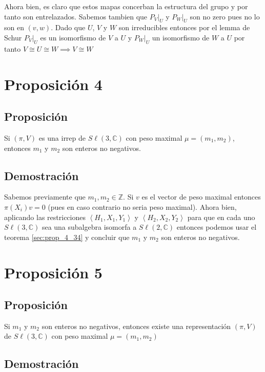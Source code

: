 \documentclass[12pt]{exam}
\begin{document}
Ahora bien, es claro que estos mapas concerban la estructura del grupo y por tanto son entrelazados. Sabemos tambien que $\left.P_V\right|_{U}$ y $\left.P_W\right|_{U}$ son no zero pues no lo son en $(v, w)$. Dado que $U$, $V$ y $W$ son irreducibles entonces por el lemma de Schur $\left.P_V\right|_{U}$ es un isomorfismo de $V$ a $U$ y $\left.P_W\right|_{U}$ un isomorfismo de $W$ a $U$ por tanto $V \cong U \cong W \implies V \cong W$


\section{Proposición 4}

\subsection{Proposición}

Si $(\pi, V)$ es una irrep de $S\ell(3, \mathbb{C})$ con peso maximal $\mu = (m_1, m_2)$, entonces $m_1$ y $m_2$ son enteros no negativos.


\subsection{Demostración}

Sabemos previamente que $m_1, m_2 \in \mathbb{Z}$. Si $v$ es el vector de peso maximal entonces $\pi(X_i)v = 0$ (pues en caso contrario no seria peso maximal).
Ahora bien, aplicando las restricciones $\left<H_1, X_1, Y_1\right>$ y $\left<H_2, X_2, Y_2\right>$ para que en cada uno $S\ell(3, \mathbb{C})$ sea una subalgebra isomorfa a $S\ell(2, \mathbb{C})$ entonces podemos usar el teorema \ref{sec:prop_4_34} y concluir que $m_1$ y $m_2$ son enteros no negativos.

\section{Proposición 5}

\subsection{Proposición}

Si $m_1$ y $m_2$ son enteros no negativos, entonces existe una representación $(\pi, V)$ de $S\ell(3, \mathbb{C})$ con peso maximal $\mu = (m_1, m_2)$

\subsection{Demostración}
\end{document}
